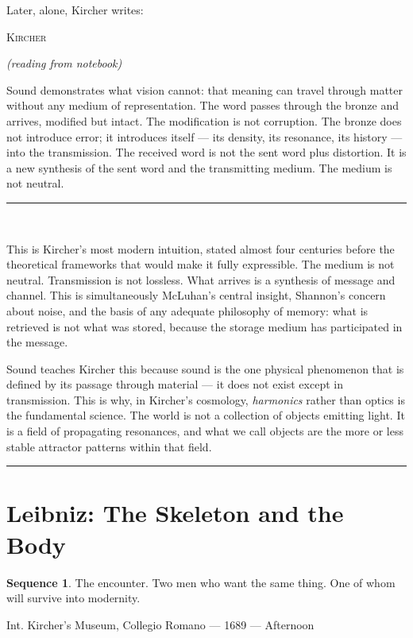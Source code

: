 \documentclass[12pt, a4paper, twoside]{memoir}
\theoremstyle{definition}
\newtheorem{sequence}{Sequence}[chapter]
\theoremstyle{remark}
\newenvironment{sceneheading}{%
  \vspace{8pt}%
  \noindent\begin{mdframed}[
    linecolor=arkgold,
    linewidth=0.8pt,
    leftmargin=0pt,
    rightmargin=0pt,
    innerleftmargin=6pt,
    innerrightmargin=6pt,
    innertopmargin=4pt,
    innerbottommargin=4pt,
    backgroundcolor=arkgold!6
  ]%
  \noindent\textsc\bgroup\small
}{%
  \egroup\end{mdframed}\vspace{4pt}%
}
\newenvironment{action}{%
  \vspace{4pt}%
  \noindent\begin{minipage}{\linewidth}%
  \setlength{\parindent}{0pt}%
  \itshape\color{kircherink}%
}{%
  \end{minipage}\vspace{6pt}%
}
\newenvironment{dialogue}[1]{%
  \vspace{6pt}%
  \noindent\hspace{24mm}%
  \begin{minipage}{0.6\linewidth}%
  \begin{center}%
  {\small\textsc{#1}}%
  \end{center}%
  \vspace{2pt}%
}{%
  \end{minipage}\vspace{6pt}%
}
\newcommand{\paren}[1]{%
  \begin{center}%
  \small\itshape\color{plaguegrey}(#1)%
  \end{center}%
}
\newenvironment{interlude}{%
  \vspace{10pt}%
  \noindent\rule{\linewidth}{0.4pt}\\[2pt]%
  \noindent{\small\textsc{Theoretical Interlude}}\smallskip%
  \begin{mdframed}[
    linecolor=cosmosblue,
    linewidth=0.6pt,
    backgroundcolor=cosmosblue!4,
    innerleftmargin=10pt,
    innerrightmargin=10pt,
    innertopmargin=8pt,
    innerbottommargin=8pt,
    leftmargin=0pt,
    rightmargin=0pt,
  ]%
  \small
}{%
  \end{mdframed}%
  \vspace{6pt}%
  \noindent\rule{\linewidth}{0.4pt}\vspace{8pt}%
}
\begin{document}
\begin{action}
Later, alone, Kircher writes:
\end{action}

\begin{dialogue}{Kircher}
\paren{reading from notebook}
Sound demonstrates what vision cannot: that meaning can travel through matter without any medium of representation. The word passes through the bronze and arrives, modified but intact. The modification is not corruption. The bronze does not introduce error; it introduces itself --- its density, its resonance, its history --- into the transmission. The received word is not the sent word plus distortion. It is a new synthesis of the sent word and the transmitting medium. The medium is not neutral.
\end{dialogue}

\begin{interlude}
This is Kircher's most modern intuition, stated almost four centuries before the theoretical frameworks that would make it fully expressible. The medium is not neutral. Transmission is not lossless. What arrives is a synthesis of message and channel. This is simultaneously McLuhan's central insight, Shannon's concern about noise, and the basis of any adequate philosophy of memory: what is retrieved is not what was stored, because the storage medium has participated in the message.

Sound teaches Kircher this because sound is the one physical phenomenon that is defined by its passage through material --- it does not exist except in transmission. This is why, in Kircher's cosmology, \textit{harmonics} rather than optics is the fundamental science. The world is not a collection of objects emitting light. It is a field of propagating resonances, and what we call objects are the more or less stable attractor patterns within that field.
\end{interlude}

\clearpage

\section{Leibniz: The Skeleton and the Body}

\begin{sequence}
\label{seq:leibniz}
The encounter. Two men who want the same thing. One of whom will survive into modernity.
\end{sequence}

\begin{sceneheading}
Int. Kircher's Museum, Collegio Romano --- 1689 --- Afternoon
\end{sceneheading}
\end{document}
